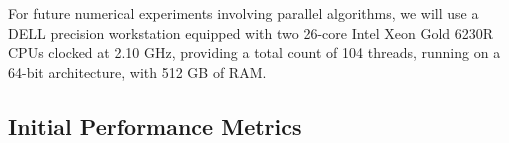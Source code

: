 For future numerical experiments involving parallel algorithms, we will use a DELL precision workstation equipped with two 26-core Intel Xeon Gold 6230R CPUs clocked at 2.10 GHz, providing a total count of 104 threads, running on a 64-bit architecture, with 512 GB of RAM.



\subsection{Initial Performance Metrics}
\label{sec:WP1:CGAL:metrics}



%

